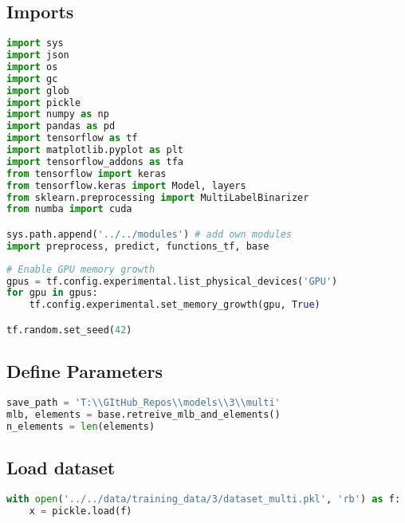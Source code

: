 \hypertarget{imports}{%
\subsection*{Imports}\label{imports}}

\begin{lstlisting}[language=Python]
import sys
import json
import os
import gc
import glob
import pickle
import numpy as np
import pandas as pd
import tensorflow as tf
import matplotlib.pyplot as plt
import tensorflow_addons as tfa
from tensorflow import keras
from tensorflow.keras import Model, layers
from sklearn.preprocessing import MultiLabelBinarizer
from numba import cuda

sys.path.append('../../modules') # add own modules
import preprocess, predict, functions_tf, base
\end{lstlisting}

\begin{lstlisting}[language=Python]
# Enable GPU memory growth
gpus = tf.config.experimental.list_physical_devices('GPU')
for gpu in gpus:
    tf.config.experimental.set_memory_growth(gpu, True)

tf.random.set_seed(42)
\end{lstlisting}

\hypertarget{define-parameters}{%
\subsection*{Define Parameters}\label{define-parameters}}

\begin{lstlisting}[language=Python]
save_path = 'T:\\GItHub_Repos\\models\\3\\multi'
mlb, elements = base.retreive_mlb_and_elements()
n_elements = len(elements)
\end{lstlisting}

\hypertarget{load-dataset}{%
\subsection*{Load dataset}\label{load-dataset}}

\begin{lstlisting}[language=Python]
with open('../../data/training_data/3/dataset_multi.pkl', 'rb') as f:
    x = pickle.load(f)
\end{lstlisting}


